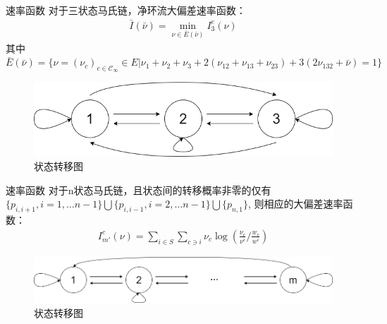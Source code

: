\documentclass{beamer}
\begin{document}
	\begin{frame}{速率函数}
		对于三状态马氏链，净环流大偏差速率函数：
		\begin{align*}
			\bar{I}(\bar{\nu}) = \min_{\nu \in \bar{E}(\bar{\nu})} I^c_3(\nu)
		\end{align*}
		其中 $\bar{E}(\bar{\nu}) = \{\nu = (\nu_c)_{c \in \mathcal{C}_{\infty}} \in E | \nu_1 +\nu_2 +\nu_3 +2(\nu_{12} +\nu_{13} +\nu_{23}) +3(2\nu_{132} +\bar{\nu})=1\}$

		\begin{figure}[h]
			\centering
			\includegraphics[scale=0.3]{3-state.png}
			\caption*{状态转移图}
		\end{figure}
	\end{frame}

	\begin{frame}{速率函数}
		对于n状态马氏链，且状态间的转移概率非零的仅有$\{p_{i, i+1}, i=1, \dots n-1\} \bigcup \{p_{i, i-1}, i=2, \dots n-1\} \bigcup \{p_{n,1}\}$, 则相应的大偏差速率函数：
		\begin{align*}
			I_{m'}^{c}(\nu) = \sum_{i \in S} \sum_{c \ni i} \nu_c \log \left(\frac{\nu_c}{\nu^i} /\frac{w_c}{w^i}\right)
		\end{align*}
		\begin{figure}[h]
			\centering
			\includegraphics[scale=0.3]{n-state.png}
			\caption*{状态转移图}
		\end{figure}
	\end{frame}
\end{document}
